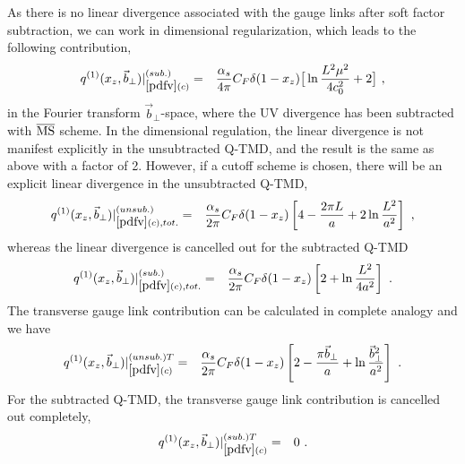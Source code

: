 \documentclass[aps,prd,preprint,tightenlines,superscriptaddress,nofootinbib]{revtex4}
\begin{document}
As there is no linear divergence associated with the gauge links after soft factor subtraction, 
we can work in dimensional regularization, which leads to the following contribution,
\begin{eqnarray}\label{3csub}
q^{(1)}(x_z,{\vec b}_\perp)|_{\ref{pdfv}(c)}^{(sub.)}&=&\frac{\alpha_s}{4\pi}
C_F\delta(1-x_z)\big[\ln\frac{L^2\mu^2}{4c_0^2}+2\big] \ ,
\end{eqnarray}
in the Fourier transform ${\vec b}_\perp$-space, where the UV divergence
has been subtracted with $\overline{\rm MS}$ scheme. In the dimensional
regulation, the linear divergence is not manifest explicitly in the unsubtracted Q-TMD, 
and the result is the same as above with a factor of 2.
However, if a cutoff scheme is chosen, there will be an explicit linear divergence
in the unsubtracted Q-TMD,  
\begin{eqnarray}
q^{(1)}(x_z,{\vec b}_\perp)|_{\ref{pdfv}(c), tot.}^{(unsub.)}&=&\frac{\alpha_s}{2\pi}
C_F\delta(1-x_z)\left[4-\frac{2\pi L}{a}+2\ln\frac{L^2}{a^2}\right] \ ,
\end{eqnarray}
whereas the linear divergence is cancelled out for the subtracted Q-TMD 
\begin{eqnarray}
q^{(1)}(x_z,{\vec b}_\perp)|_{\ref{pdfv}(c), tot.}^{(sub.)}&=&\frac{\alpha_s}{2\pi}
C_F\delta(1-x_z)\left[2+\ln\frac{L^2}{4a^2}\right] \ .\label{e16}
\end{eqnarray}
The transverse gauge link contribution can be calculated 
in complete analogy and we have 
\begin{eqnarray}
q^{(1)}(x_z,{\vec b}_\perp)|_{\ref{pdfv}(c)}^{(unsub.)T}&=&\frac{\alpha_s}{2\pi}
C_F\delta(1-x_z)\left[2-\frac{\pi {\vec b}_\perp}{a}+ \ln\frac{{\vec b}_\perp^2}{a^2}\right] \ .
\end{eqnarray}
For the subtracted Q-TMD, the transverse gauge link contribution is cancelled out
completely,  
\begin{eqnarray}\label{3csubT}
q^{(1)}(x_z,{\vec b}_\perp)|_{\ref{pdfv}(c)}^{(sub.)T}&=&0 \ .
\end{eqnarray}
\end{document}
